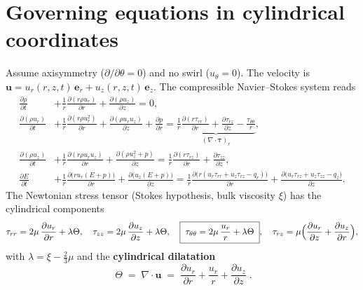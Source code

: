 \documentclass[11pt]{article}
\newcommand{\pd}[2]{\frac{\partial #1}{\partial #2}}
\newcommand{\ur}{u_r}
\newcommand{\uz}{u_z}
\begin{document}
\section{Governing equations in cylindrical coordinates}
Assume axisymmetry ($\partial/\partial\theta = 0$) and no swirl
($u_\theta=0$).  The velocity is $\bm u = \ur(r,z,t)\,\bm e_r +
\uz(r,z,t)\,\bm e_z$.  The compressible Navier--Stokes system reads
\begin{align}
\pd{\rho}{t} &+ \frac1r\pd{(r\rho\ur)}{r} + \pd{(\rho\uz)}{z} = 0,
\label{eq:cont}\\[2pt]
\pd{(\rho\ur)}{t} &+ \frac1r\pd{(r\rho\ur^2)}{r} + \pd{(\rho\ur\uz)}{z}
   + \pd{p}{r}
   = \underbrace{\frac1r\pd{(r\tau_{rr})}{r} + \pd{\tau_{rz}}{z}
     - \frac{\tau_{\theta\theta}}{r}}_{(\nabla\cdot\bm\tau)_r},
\label{eq:rmom}\\[2pt]
\pd{(\rho\uz)}{t} &+ \frac1r\pd{(r\rho\ur\uz)}{r} + \pd{(\rho\uz^2+p)}{z}
   = \frac1r\pd{(r\tau_{rz})}{r} + \pd{\tau_{zz}}{z},
\label{eq:zmom}\\[2pt]
\pd{E}{t} &+ \frac1r\pd{\bigl(r\ur(E+p)\bigr)}{r}
   + \pd{\bigl(\uz(E+p)\bigr)}{z}
   = \frac1r\pd{\bigl(r(\ur\tau_{rr}+\uz\tau_{rz}-q_r)\bigr)}{r}
   + \pd{\bigl(\ur\tau_{rz}+\uz\tau_{zz}-q_z\bigr)}{z}.
\label{eq:ene}
\end{align}
The Newtonian stress tensor (Stokes hypothesis, bulk viscosity $\xi$) has
the cylindrical components
\begin{equation}
\tau_{rr}=2\mu\,\pd{\ur}{r}+\lambda\Theta,\quad
\tau_{zz}=2\mu\,\pd{\uz}{z}+\lambda\Theta,\quad
\boxed{\;\tau_{\theta\theta}=2\mu\,\frac{\ur}{r}+\lambda\Theta\;},\quad
\tau_{rz}=\mu\Bigl(\pd{\ur}{z}+\pd{\uz}{r}\Bigr),
\label{eq:stress}
\end{equation}
with $\lambda=\xi-\tfrac23\mu$ and the \textbf{cylindrical dilatation}
\begin{equation}
\boxed{\;\Theta \;=\; \nabla\!\cdot\!\bm u
   \;=\; \pd{\ur}{r} + \frac{\ur}{r} + \pd{\uz}{z}\;}.
\label{eq:div}
\end{equation}
\end{document}
